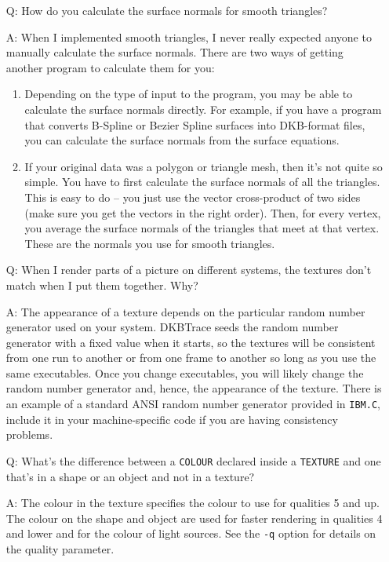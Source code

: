 \begin{itemize}
\item[Q:] How do you calculate the surface
normals for smooth triangles?
\item[A:] When I implemented smooth triangles, I never really expected
anyone to manually calculate the surface normals.  There are two ways
of getting another program to calculate them for you:
\begin{enumerate}
\item Depending on the type of input to the program, you may be able to
calculate the surface normals directly.  For example, if you have
a program that converts B-Spline or Bezier Spline surfaces into
DKB-format files, you can calculate the surface normals from the
surface equations.
\item If your original data was a polygon or triangle mesh, then it's
not quite so simple.  You have to first calculate the surface
normals of all the triangles.  This is easy to do -- you just use
the vector cross-product of two sides (make sure you get the
vectors in the right order).  Then, for every vertex, you average
the surface normals of the triangles that meet at that vertex.
These are the normals you use for smooth triangles.
\end{enumerate}

\item[Q:] When I render parts of a picture on different systems, the
textures don't match when I put them
together.  Why?
\item[A:] The appearance of a texture depends on the particular random number
generator used on your system.  DKBTrace seeds the random number
generator with a fixed value when it starts, so the textures will be
consistent from one run to another or from one frame to another so
long as you use the same executables.  Once you change executables,
you will likely change the random number generator and, hence, the
appearance of the texture.  There is an example of a standard ANSI
random number generator provided in {\tt IBM.C}, include it in your
machine-specific code if you are having consistency problems.

\item[Q:] What's the difference
between a {\tt COLOUR}
declared inside a {\tt TEXTURE} and one that's in
a shape or an object and not in a texture?
\item[A:] The colour in the texture specifies the colour to use for qualities
5 and up.  The colour on the shape and object are used for faster
rendering in qualities 4 and lower and for the colour of light sources.
See the {\tt -q} option for details on the quality parameter.


\end{itemize}
